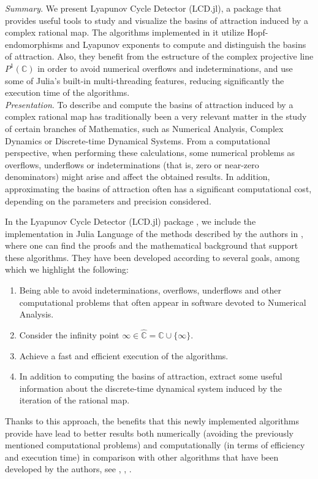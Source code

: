 \documentclass{juliacon}
\begin{document}


\maketitle

\textit{Summary}. We present Lyapunov Cycle Detector (LCD.jl), a package that provides useful tools to study and visualize the basins of attraction induced by a complex rational map. The algorithms implemented in it utilize Hopf-endomorphisms and Lyapunov exponents to compute and distinguish the basins of attraction. Also, they benefit from the estructure of the complex projective line $P^1(\mathbb{C})$ in order to avoid numerical overflows and indeterminations, and use some of Julia's built-in multi-threading features, reducing significantly the execution time of the algorithms.\\

\textit{Presentation}. To describe and compute the basins of attraction induced by a complex rational map has traditionally been a very relevant matter in the study of certain branches of Mathematics, such as Numerical Analysis, Complex Dynamics or Discrete-time Dynamical Systems. From a computational perspective, when performing these calculations, some numerical problems as overflows, underflows or indeterminations (that is, zero or near-zero denominators) might arise and affect the obtained results. In addition, approximating the basins of attraction often has a significant computational cost, depending on the parameters and precision considered.

In the Lyapunov Cycle Detector (LCD.jl) package \cite{alvarez}, we include the implementation in Julia Language \cite{bezanson} of the methods described by the authors in \cite{preprint}, where one can find the proofs and the mathematical background that support these algorithms. They have been developed according to several goals, among which we highlight the following:
\begin{enumerate}
    \item Being able to avoid indeterminations, overflows, underflows and other computational problems that often appear in software devoted to Numerical Analysis.
    \item Consider the infinity point $\infty\in\hat{\mathbb{C}}=\mathbb{C}\cup\{\infty\}$.
    \item Achieve a fast and efficient execution of the algorithms.
    \item In addition to computing the basins of attraction, extract some useful information about the discrete-time dynamical system induced by the iteration of the rational map.
\end{enumerate}
Thanks to this approach, the benefits that this newly implemented algorithms provide have lead to better results both numerically (avoiding the previously mentioned computational problems) and computationally (in terms of efficiency and execution time) in comparison with other algorithms that have been developed by the authors, see \cite{julia}, \cite{lj}, \cite{sage}.\\
\end{document}
